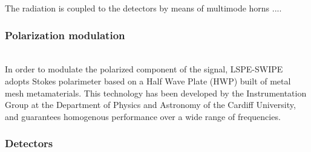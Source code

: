 The radiation is coupled to the detectors by means of multimode horns
\citep{legg2016} ....


\subsubsection{Polarization modulation}
 \\
In order to modulate the polarized component of the signal, LSPE-SWIPE adopts 
Stokes polarimeter based on a Half Wave Plate (HWP) built of metal mesh 
metamaterials. This technology has been developed by the Instrumentation Group 
at the Department of Physics and Astronomy of the Cardiff University, and 
guarantees homogenous performance over a wide range of frequencies. 




\subsubsection{Detectors}

\\ 



